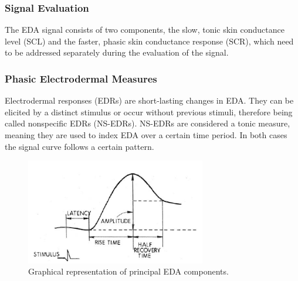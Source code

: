 \subsubsection{Signal Evaluation}
The EDA signal consists of two components, the slow, tonic skin conductance level (SCL) and the faster, phasic skin conductance response (SCR), which need to be addressed separately during the evaluation of the signal.

\subsubsection*{Phasic Electrodermal Measures}
Electrodermal responses (EDRs) are short-lasting changes in EDA. They can be elicited by a distinct stimulus or occur without previous stimuli, therefore being called nonspecific EDRs (NS-EDRs). NS-EDRs are considered a tonic measure, meaning they are used to index EDA over a certain time period. In both cases the signal curve follows a certain pattern.

\begin{figure}[ht]
\centering
\includegraphics[width=0.7\textwidth]{images/SCR.png}
\caption{Graphical representation of principal EDA components.\citep{HANDBOOKPP}}
\label{SCRImg}
\end{figure}

